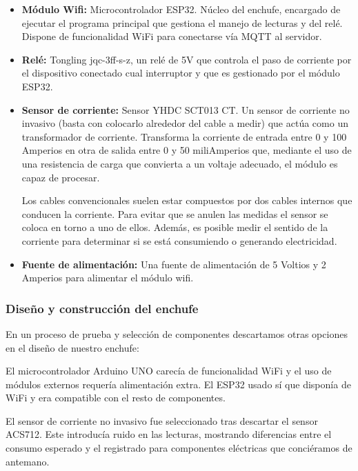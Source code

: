 \documentclass[a4paper,10pt]{article}
\begin{document}
\begin{itemize}
\item{\textbf{Módulo Wifi:} Microcontrolador
  ESP32\cite{ESP32SeriesDatasheet}. Núcleo del enchufe, encargado de
  ejecutar el programa principal que gestiona el manejo de lecturas y
  del relé. Dispone de funcionalidad WiFi para conectarse vía MQTT al
  servidor.}

\item{\textbf{Relé:} Tongling jqc-3ff-s-z, un relé de 5V que controla
  el paso de corriente por el dispositivo conectado cual interruptor y
  que es gestionado por el módulo ESP32.}

\item{\textbf{Sensor de corriente:} Sensor YHDC SCT013 CT. Un
  sensor de corriente no invasivo (basta con colocarlo alrededor del
  cable a medir) que actúa como un transformador de
  corriente. Transforma la corriente de entrada entre 0 y 100 Amperios
  en otra de salida entre 0 y 50 miliAmperios que, mediante el uso de
  una resistencia de carga que convierta a un voltaje adecuado, el
  módulo es capaz de procesar.

  Los cables convencionales suelen estar compuestos por dos cables
  internos que conducen la corriente. Para evitar que se anulen las
  medidas el sensor se coloca en torno a uno de ellos. Además, es
  posible medir el sentido de la corriente para determinar si se está
  consumiendo o generando electricidad.}

\item{\textbf{Fuente de alimentación:} Una fuente de alimentación de
  5 Voltios y 2 Amperios para alimentar el módulo wifi.}
\end{itemize}

\subsubsection{Diseño y construcción del enchufe}

En un proceso de prueba y selección de componentes descartamos otras
opciones en el diseño de nuestro enchufe:

El microcontrolador Arduino UNO carecía de funcionalidad WiFi y el uso de módulos
externos requería alimentación extra. El ESP32 usado sí que disponía
de WiFi y era compatible con el resto de componentes.

El sensor de corriente no invasivo fue seleccionado tras descartar el
sensor ACS712\cite{ACS712DatasheetPDF}. Este introducía ruido en las
lecturas, mostrando diferencias entre el consumo esperado y el
registrado para componentes eléctricas que conciéramos de antemano.
\end{document}
